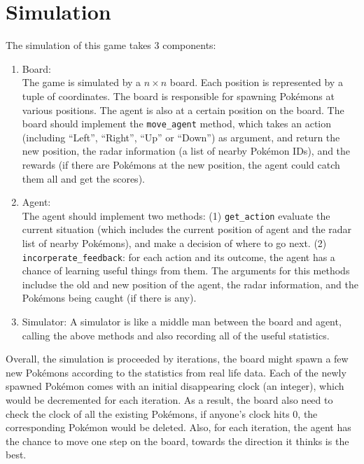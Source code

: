 \documentclass[12pt]{article}
\begin{document}
\section*{Simulation}
The simulation of this game takes 3 components:
\begin{enumerate}[label=(\alph*)]
    \item Board: \\
    The game is simulated by a $n \times n$ board. Each position is 
    represented by a tuple of coordinates. The board is responsible for
    spawning Pok\'emons at various positions. The agent
    is also at a certain position on the board. The board should
    implement the \texttt{move\_agent} method, which takes an action
    (including ``Left'', ``Right'', ``Up'' or ``Down'') as argument,
    and
	return the new position, the radar information (a list of nearby
	Pok\'emon IDs), and the rewards (if there are Pok\'emons at the
	new position, the agent could catch them all and get the scores).
	\item Agent: \\
	The agent should implement two methods: (1) \texttt{get\_action} 
	evaluate the current situation (which includes the current
	position of agent and the radar list of nearby Pok\'emons), 
	and make a decision of where
	to go next.
	(2) \texttt{incorperate\_feedback}: for each action and its outcome,
	 the agent has a chance of learning useful things from them. The 
	arguments for this methods includse the old and new position of the 
	agent, the radar information, and the Pok\'emons being caught 
	(if there is any).
	\item Simulator:
	A simulator is like a middle man between the board and agent, 
	calling the above methods and also recording all of the useful
	statistics.
\end{enumerate}
\par
Overall, the simulation is proceeded by iterations, the board might spawn a few new Pok\'emons according to the statistics
from real life data. Each of the newly spawned Pok\'emon comes with
an initial disappearing clock (an integer), which would
be decremented for each iteration. As a result, the board also need to 
check the clock of all the existing Pok\'emons, if anyone's clock 
hits 0, the corresponding Pok\'emon would be deleted. Also, for 
each iteration, the agent has the chance to move one step on the 
board, towards the direction it thinks is the best. 
\end{document}
